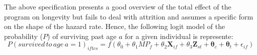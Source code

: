 The above specification presents a good overview of the total effect of the program on longevity but fails to deal with attrition and assumes a specific form on the shape of the hazard rate. Hence, the following logit model of the probability ($P$) of surviving past age $a$ for a given individual is represente:
$$
P(survived\,to\,age\,a=1)_{iftcs} = f(\theta_0 + \theta_1MP_f + \theta_2\mathbf{X}_{if} + \theta_3\mathbf{Z}_{st} + \mathbf{\theta}_c + \mathbf{\theta}_t + \epsilon_{if})
$$